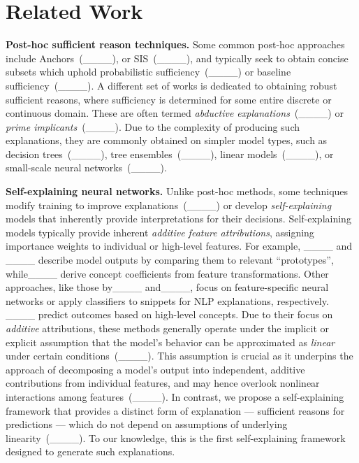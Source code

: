 \section{Related Work}

\textbf{Post-hoc sufficient reason techniques.} Some common post-hoc approaches include Anchors~(____), or SIS~(____), and typically seek to obtain concise subsets which uphold probabilistic sufficiency~(____) or baseline sufficiency~(____). A different set of works is dedicated to obtaining robust sufficient reasons, where sufficiency is determined for some entire discrete or continuous domain. These are often termed \emph{abductive explanations}~(____) or \emph{prime implicants}~(____). Due to the complexity of producing such explanations, they are commonly obtained on simpler model types, such as decision trees~(____), tree ensembles~(____), linear models~(____), or small-scale neural networks~(____).

\textbf{Self-explaining neural networks.} Unlike post-hoc methods, some techniques modify training to improve explanations~(____) or develop \emph{self-explaining} models that inherently provide interpretations for their decisions. Self-explaining models typically provide inherent \emph{additive feature attributions}, assigning importance weights to individual or high-level features. For example, ____ and ____ describe model outputs by comparing them to relevant ``prototypes'', while____ derive concept coefficients from feature transformations. Other approaches, like those by____ and____, focus on feature-specific neural networks or apply classifiers to snippets for NLP explanations, respectively. ____ predict outcomes based on high-level concepts. Due to their focus on \emph{additive} attributions, these methods generally operate under the implicit or explicit assumption that the model's behavior can be approximated as \emph{linear} under certain conditions~(____). This assumption is crucial as it underpins the approach of decomposing a model’s output into independent, additive contributions from individual features, and may hence overlook nonlinear interactions among features~(____). In contrast, we propose a self-explaining framework that provides a distinct form of explanation --- sufficient reasons for predictions --- which do not depend on assumptions of underlying linearity~(____). To our knowledge, this is the first self-explaining framework designed to generate such explanations.




